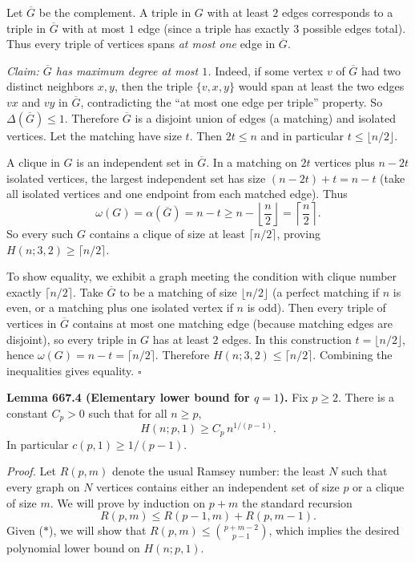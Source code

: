 Let $\overline{G}$ be the complement.
A triple in $G$ with at least $2$ edges corresponds to a triple in $\overline{G}$ with at most $1$ edge (since a triple has exactly $3$ possible edges total).
Thus every triple of vertices spans \emph{at most one} edge in $\overline{G}$.

\emph{Claim: $\overline{G}$ has maximum degree at most $1$.}
Indeed, if some vertex $v$ of $\overline{G}$ had two distinct neighbors $x,y$, then the triple $\{v,x,y\}$ would span at least the two edges $vx$ and $vy$ in $\overline{G}$, contradicting the ``at most one edge per triple'' property.
So $\Delta(\overline{G})\le 1$.
Therefore $\overline{G}$ is a disjoint union of edges (a matching) and isolated vertices.
Let the matching have size $t$.
Then $2t\le n$ and in particular $t\le \lfloor n/2\rfloor$.

A clique in $G$ is an independent set in $\overline{G}$. In a matching on $2t$ vertices plus $n-2t$ isolated vertices, the largest independent set has size $(n-2t)+t = n-t$ (take all isolated vertices and one endpoint from each matched edge).
Thus
\[
\omega(G)=\alpha(\overline{G})=n-t \ge n-\left\lfloor \frac{n}{2}\right\rfloor = \left\lceil \frac{n}{2}\right\rceil.
\]
So every such $G$ contains a clique of size at least $\lceil n/2\rceil$, proving
$H(n;3,2)\ge \lceil n/2\rceil$.

To show equality, we exhibit a graph meeting the condition with clique number exactly $\lceil n/2\rceil$.
Take $\overline{G}$ to be a matching of size $\lfloor n/2\rfloor$ (a perfect matching if $n$ is even, or a matching plus one isolated vertex if $n$ is odd).
Then every triple of vertices in $\overline{G}$ contains at most one matching edge (because matching edges are disjoint), so every triple in $G$ has at least $2$ edges.
In this construction $t=\lfloor n/2\rfloor$, hence $\omega(G)=n-t=\lceil n/2\rceil$.
Therefore $H(n;3,2)\le \lceil n/2\rceil$.
Combining the inequalities gives equality.
\hfill$\square$

\medskip
\noindent\textbf{Lemma 667.4 (Elementary lower bound for $q=1$).}
Fix $p\ge 2$.
There is a constant $C_p>0$ such that for all $n\ge p$,
\[
H(n;p,1) \ge C_p\, n^{1/(p-1)}.
\]
In particular $c(p,1)\ge 1/(p-1)$.

\noindent\emph{Proof.}
Let $R(p,m)$ denote the usual Ramsey number: the least $N$ such that every graph on $N$ vertices contains either an independent set of size $p$ or a clique of size $m$.
We will prove by induction on $p+m$ the standard recursion
\begin{equation}
R(p,m)\le R(p-1,m)+R(p,m-1).
\tag{$\ast$}
\end{equation}
Given ($\ast$), we will show that $R(p,m)\le \binom{p+m-2}{p-1}$, which implies the desired polynomial lower bound on $H(n;p,1)$.

